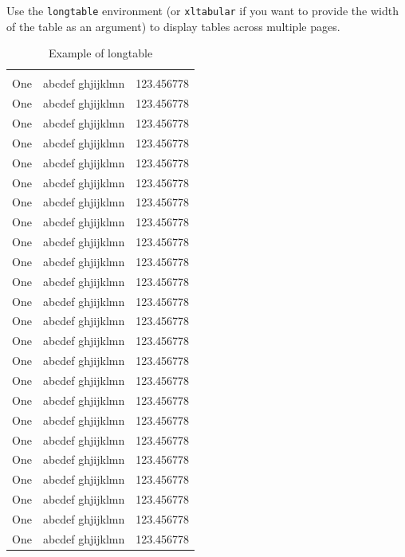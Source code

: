 Use the \texttt{longtable} environment (or \texttt{xltabular} if you want to provide the width of the table as an argument) to display tables across multiple pages.

\begin{xltabular}{\linewidth}{RRR}
  \caption{Example of longtable}\label{tab:longtable-example}\\
  \toprule
  {} & {} & {} \\
  \midrule
  \endhead
  \midrule
   \\
  \midrule
  \endfoot
  
  \bottomrule
  \endlastfoot
  One & abcdef ghjijklmn & 123.456778 \\
  One & abcdef ghjijklmn & 123.456778 \\
  One & abcdef ghjijklmn & 123.456778 \\
  One & abcdef ghjijklmn & 123.456778 \\
  One & abcdef ghjijklmn & 123.456778 \\
  One & abcdef ghjijklmn & 123.456778 \\
  One & abcdef ghjijklmn & 123.456778 \\
  One & abcdef ghjijklmn & 123.456778 \\
  One & abcdef ghjijklmn & 123.456778 \\
  One & abcdef ghjijklmn & 123.456778 \\
  One & abcdef ghjijklmn & 123.456778 \\
  One & abcdef ghjijklmn & 123.456778 \\
  One & abcdef ghjijklmn & 123.456778 \\
  One & abcdef ghjijklmn & 123.456778 \\
  One & abcdef ghjijklmn & 123.456778 \\
  One & abcdef ghjijklmn & 123.456778 \\
  One & abcdef ghjijklmn & 123.456778 \\
  One & abcdef ghjijklmn & 123.456778 \\
  One & abcdef ghjijklmn & 123.456778 \\
  One & abcdef ghjijklmn & 123.456778 \\
  One & abcdef ghjijklmn & 123.456778 \\
  One & abcdef ghjijklmn & 123.456778 \\
  One & abcdef ghjijklmn & 123.456778 \\
  One & abcdef ghjijklmn & 123.456778 \\

\end{xltabular}
